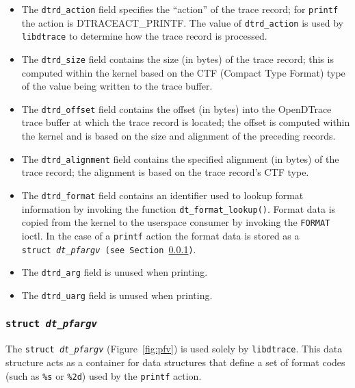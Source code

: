 \begin{itemize}

	\item The \texttt{dtrd\_action} field specifies the ``action'' of the
trace record; for \texttt{printf} the action is DTRACEACT\_PRINTF. The value of
\texttt{dtrd\_action} is used by \texttt{libdtrace} to determine how the trace
record is processed.

	\item The \texttt{dtrd\_size} field contains the size (in bytes) of the
trace record; this is computed within the kernel based on the CTF (Compact Type
Format) type of the value being written to the trace buffer.

	\item The \texttt{dtrd\_offset} field contains the offset (in bytes)
into the OpenDTrace trace buffer at which the trace record is located; the offset
is computed within the kernel and is based on the size and alignment of the
preceding records.

	\item The \texttt{dtrd\_alignment} field contains the specified
alignment (in bytes) of the trace record; the alignment is based on the trace
record's CTF type.

	\item The \texttt{dtrd\_format} field contains an identifier used to lookup
format information by invoking the function \texttt{dt\_format\_lookup()}.
Format data is copied from the kernel to the userspace consumer by invoking the
\texttt{FORMAT} ioctl. In the case of a \texttt{printf} action the format data
is stored as a \texttt{struct~\textit{dt\_pfargv} (see
Section~\ref{subsubsec:pfv})}. 

	\item The \texttt{dtrd\_arg} field is unused when printing.

	\item The \texttt{dtrd\_uarg} field is unused when printing.

\end{itemize}

\subsubsection{\texttt{struct~\textit{dt\_pfargv}}}
\label{subsubsec:pfv}

The \texttt{struct~\textit{dt\_pfargv}} (Figure~\ref{fig:pfv}) is used solely
by \texttt{libdtrace}. This data structure acts as a container for data
structures that define a set of format codes (such as \texttt{\%s} or
\texttt{\%2d}) used by the \texttt{printf} action.

